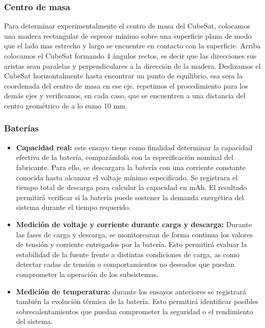     \subsubsection{Centro de masa}
      Para determinar experimentalmente el centro de masa del CubeSat, colocamos una madera rectangular de espesor
      mínimo sobre una superficie plana de modo que el lado mas estrecho y largo se encuentre en contacto con la
      superficie. Arriba colocamos el CubeSat formando 4 ángulos rectos, es decir que las direcciones sus aristas sean
      paralelas y perpendiculares a la dirección de la madera. Deslizamos el CubeSat horizontalmente hasta encontrar un
      punto de equilibrio, esa sera la coordenada del centro de masa en ese eje. repetimos el procedimiento para los
      demás ejes y verificamos, en cada caso, que se encuentren a una distancia del centro geométrico de a lo sumo 10
      mm.

    \subsubsection{Baterías}
      \begin{itemize}
        \item \textbf{Capacidad real:} este ensayo tiene como finalidad determinar la capacidad efectiva de la batería,
          comparándola con la especificación nominal del fabricante. Para ello, se descargara la batería con una
          corriente constante conocida hasta alcanzar el voltaje mínimo especificado. Se registrara el tiempo total de
          descarga para calcular la capacidad en mAh.  El resultado permitirá verificar si la batería puede sostener la
          demanda energética del sistema durante el tiempo requerido.

        \item \textbf{Medición de voltaje y corriente durante carga y descarga:} Durante las fases de carga y descarga,
          se monitorearan de forma continua los valores de tensión y corriente entregados por la batería. Esto permitirá
          evaluar la estabilidad de la fuente frente a distintas condiciones de carga, as como detectar cadas de tensión
          o comportamientos no deseados que puedan comprometer la operación de los subsistemas.

        \item \textbf{Medición de temperatura:} durante los ensayos anteriores se registrará también la evolución
          térmica de la batería. Esto permitirá identificar posibles sobrecalentamientos que puedan comprometer la
          seguridad o el rendimiento del sistema.
      \end{itemize}

